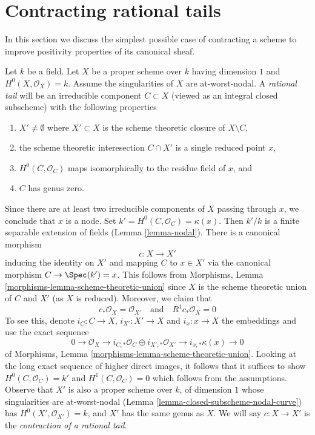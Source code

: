 \section{Contracting rational tails}
\label{section-contracting-rational-tails}

\noindent
In this section we discuss the simplest possible case of contracting
a scheme to improve positivity properties of its canonical sheaf.

\begin{example}
\label{example-rational-tail}
Let $k$ be a field. Let $X$ be a proper scheme over $k$ having dimension $1$
and $H^0(X, \mathcal{O}_X) = k$. Assume the singularities of $X$ are
at-worst-nodal.
A {\it rational tail} will be an irreducible component $C \subset X$
(viewed as an integral closed subscheme) with the following properties
\begin{enumerate}
\item $X' \not = \emptyset$ where $X' \subset X$ is the scheme theoretic closure
of $X \setminus C$,
\item the scheme theoretic interesection $C \cap X'$ is a single
reduced point $x$,
\item $H^0(C, \mathcal{O}_C)$ maps isomorphically to the
residue field of $x$, and
\item $C$ has genus zero.
\end{enumerate}
Since there are at least two irreducible components of $X$ passing through
$x$, we conclude that $x$ is a node.
Set $k' = H^0(C, \mathcal{O}_C) = \kappa(x)$.
Then $k'/k$ is a finite separable extension of fields
(Lemma \ref{lemma-nodal}). There is a canonical morphism
$$
c : X \longrightarrow X'
$$
inducing the identity on $X'$ and mapping $C$ to $x \in X'$
via the canonical morphism $C \to \Spec(k') = x$. This follows from
Morphisms, Lemma \ref{morphisms-lemma-scheme-theoretic-union}
since $X$ is the scheme theoretic union of $C$ and $X'$ (as $X$ is reduced).
Moreover, we claim that
$$
c_*\mathcal{O}_X = \mathcal{O}_{X'}
\quad\text{and}\quad
R^1c_*\mathcal{O}_X = 0
$$
To see this, denote $i_C : C \to X$, $i_{X'} : X' \to X$ and $i_x : x \to X$
the embeddings and use the exact sequence
$$
0 \to \mathcal{O}_X \to
i_{C, *}\mathcal{O}_C \oplus i_{X', *}\mathcal{O}_{X'} \to
i_{x, *}\kappa(x) \to 0
$$
of Morphisms, Lemma \ref{morphisms-lemma-scheme-theoretic-union}.
Looking at the long exact sequence of higher direct images,
it follows that it suffices to show $H^0(C, \mathcal{O}_C) = k'$
and $H^1(C, \mathcal{O}_C) = 0$ which follows from the assumptions.
Observe that $X'$ is also a proper scheme over $k$, of dimension $1$
whose singularities are at-worst-nodal
(Lemma \ref{lemma-closed-subscheme-nodal-curve})
has $H^0(X', \mathcal{O}_{X'}) = k$, and
$X'$ has the same genus as $X$.
We will say $c : X \to X'$ is the
{\it contraction of a rational tail}.
\end{example}


